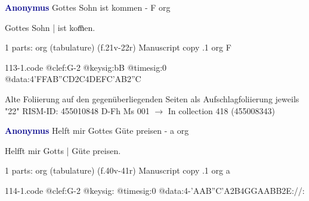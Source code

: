 \documentclass[twocolumn]{book}
\begin{document}
\newline \par \vspace{7pt} \textcolor{darkblue}{\textbf{Anonymus  }}
\newline Gottes Sohn ist kommen - F
\newline org
\newline \begin{itshape}[f.21v, at left:] Gottes Sohn | ist kom̅en.\end{itshape} 
\newline \textcolor{darkblue}{}  1 parts: org (tabulature)  (f.21v-22r)
\newline Manuscript copy
.1  org  F  
\begin{filecontents*}{113-1.code}
@clef:G-2
@keysig:bB
@timesig:0
@data:4'FFAB''CD2C4DEFC'AB2''C
\end{filecontents*}
\newline
%

\newline Alte Foliierung auf den gegenüberliegenden Seiten als Aufschlagfoliierung jeweils "22"
\newline RISM-ID: 455010848
\newline D-Fh  Ms 001
\newline $\rightarrow$ In collection 418 (455008343)
      
\newline \par \vspace{7pt} \textcolor{darkblue}{\textbf{Anonymus  }}
\newline Helft mir Gottes Güte preisen - a
\newline org
\newline \begin{itshape}[f.40v, at left:] Helfft mir Gotts | Güte preisen.\end{itshape} 
\newline \textcolor{darkblue}{}  1 parts: org (tabulature)  (f.40v-41r)
\newline Manuscript copy
.1  org  a  
\begin{filecontents*}{114-1.code}
@clef:G-2
@keysig:
@timesig:0
@data:4-'AAB''C'A2B4GGAABB2E://:
\end{filecontents*}
\newline
%
\end{document}

